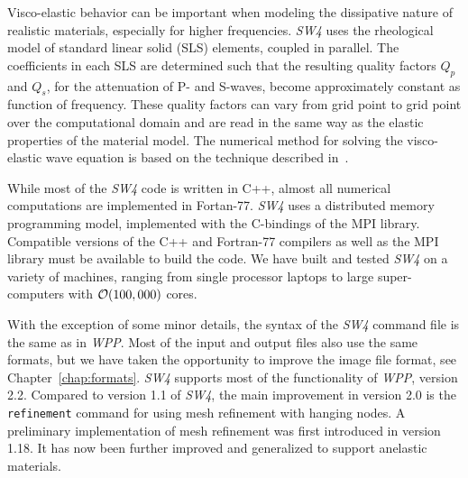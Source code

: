 \documentclass[11pt]{report}
\begin{document}
Visco-elastic behavior can be important when modeling the dissipative nature of realistic materials,
especially for higher frequencies. \emph{SW4} uses the rheological model of standard linear solid
(SLS) elements, coupled in parallel. The coefficients in each SLS are determined such that the
resulting quality factors $Q_p$ and $Q_s$, for the attenuation of P- and S-waves, become
approximately constant as function of frequency. These quality factors can vary from grid point to
grid point over the computational domain and are read in the same way as the elastic properties of
the material model. The numerical method for solving the visco-elastic wave equation is
based on the technique described in~\cite{PetSjo-10b}.

While most of the \emph{SW4} code is written in C++, almost all numerical computations are
implemented in Fortan-77. \emph{SW4} uses a distributed memory programming model, implemented with
the C-bindings of the MPI library. Compatible versions of the C++ and Fortran-77 compilers as well
as the MPI library must be available to build the code. We have built and tested
\emph{SW4} on a variety of machines, ranging from single processor laptops to large super-computers
with ${\cal O}(100,000)$ cores.

With the exception of some minor details, the syntax of the \emph{SW4} command file is the same as
in \emph{WPP}. Most of the input and output files also use the same formats, but we have taken the
opportunity to improve the image file format, see Chapter~\ref{chap:formats}.
\emph{SW4} supports most of the functionality of \emph{WPP}, version 2.2. Compared
to version 1.1 of \emph{SW4}, the main improvement in version 2.0 is the \verb+refinement+ command for
using mesh refinement with hanging nodes. A preliminary implementation of mesh refinement was first
introduced in version 1.18. It has now been further improved and generalized to support anelastic materials.

\end{document}
